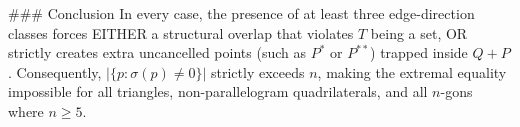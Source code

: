 ### Conclusion
In every case, the presence of at least three edge-direction classes forces EITHER a structural overlap that violates $T$ being a set, OR strictly creates extra uncancelled points (such as $P^*$ or $P^{**}$) trapped inside $Q+P$. Consequently, $|\{p : \sigma(p) \neq 0\}|$ strictly exceeds $n$, making the extremal equality impossible for all triangles, non-parallelogram quadrilaterals, and all $n$-gons where $n \ge 5$.
